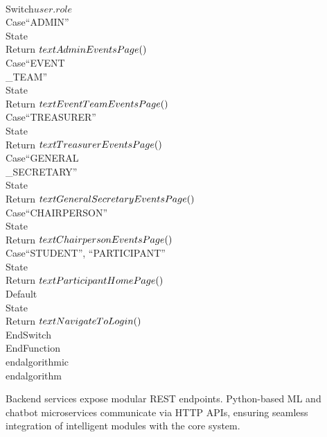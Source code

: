     \\Switch{$user.role$}
        \\Case{``ADMIN''}
            \\State \\Return $\\text{AdminEventsPage}()$
        \\Case{``EVENT\\_TEAM''}
            \\State \\Return $\\text{EventTeamEventsPage}()$
        \\Case{``TREASURER''}
            \\State \\Return $\\text{TreasurerEventsPage}()$
        \\Case{``GENERAL\\_SECRETARY''}
            \\State \\Return $\\text{GeneralSecretaryEventsPage}()$
        \\Case{``CHAIRPERSON''}
            \\State \\Return $\\text{ChairpersonEventsPage}()$
        \\Case{``STUDENT'', ``PARTICIPANT''}
            \\State \\Return $\\text{ParticipantHomePage}()$
        \\Default
            \\State \\Return $\\text{NavigateToLogin}()$
    \\EndSwitch
\\EndFunction
\\end{algorithmic}
\\end{algorithm}

Backend services expose modular REST endpoints. Python-based ML and chatbot microservices communicate via HTTP APIs, ensuring seamless integration of intelligent modules with the core system.

